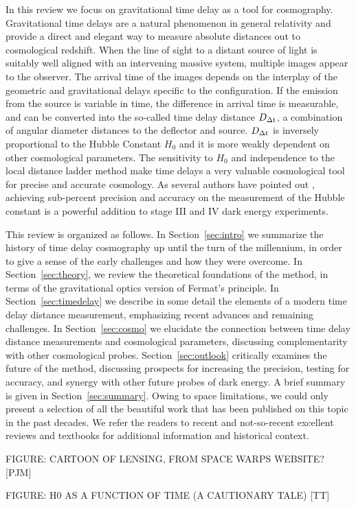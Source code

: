 In this review we focus on gravitational time delay as a tool for
cosmography.  Gravitational time delays are a natural phenomenon in
general relativity and provide a direct and elegant way to measure
absolute distances out to cosmological redshift. When the line of
sight to a distant source of light is suitably well aligned with an
intervening massive system, multiple images appear to the
observer. The arrival time of the images depends on the interplay of
the geometric and gravitational delays specific to the
configuration. If the emission from the source is variable in time,
the difference in arrival time is measurable, and can be converted
into the so-called time delay distance $D_{\Delta{\rm t}}$, a combination of angular
diameter distances to the deflector and source. $D_{\Delta{\rm t}}$ is inversely
proportional to the Hubble Constant $H_0$ and it is more weakly
dependent on other cosmological parameters. The sensitivity to $H_0$
and independence to the local distance ladder method make time delays
a very valuable cosmological tool for precise and accurate
cosmology. As several authors have pointed out
\citep{Lin11,Suy++12,Wei++13}, achieving sub-percent precision and
accuracy on the measurement of the Hubble constant is a powerful
addition to stage III and IV dark energy experiments.

This review is organized as follows. In Section~\ref{sec:intro} we
summarize the history of time delay cosmography up until the turn of
the millennium, in order to give a sense of the early challenges and
how they were overcome. In Section~\ref{sec:theory}, we review the
theoretical foundations of the method, in terms of the gravitational
optics version of Fermat's principle. In Section~\ref{sec:timedelay}
we describe in some detail the elements of a modern time delay
distance measurement, emphasizing recent advances and remaining
challenges. In Section~\ref{sec:cosmo} we elucidate the connection
between time delay distance measurements and cosmological parameters,
discussing complementarity with other cosmological
probes. Section~\ref{sec:outlook} critically examines the future of
the method, discussing prospects for increasing the precision, testing
for accuracy, and synergy with other future probes of dark energy. A
brief summary is given in Section~\ref{sec:summary}. Owing to space
limitations, we could only present a selection of all the beautiful
work that has been published on this topic in the past decades. We
refer the readers to recent
\citep{Bar10,Ell10,Tre10,TMC12,Jackson:2013p30763,Jac15,T+E15} and not-so-recent \citep{B+N92,CSS02,K+S04,Fal05,SKW06}
excellent reviews and textbooks \citep{SEF92} for additional
information and historical context.

FIGURE: CARTOON OF LENSING, FROM SPACE WARPS WEBSITE? [PJM]

FIGURE: H0 AS A FUNCTION OF TIME (A CAUTIONARY TALE) [TT]

